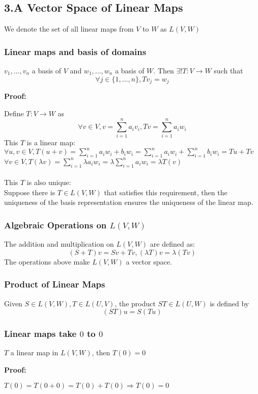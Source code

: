 \documentclass{article}
\begin{document}
\subsection{3.A Vector Space of Linear Maps}
We denote the set of all linear maps from $V$ to $W$ as $L(V, W)$
\subsubsection{Linear maps and basis of domains}
\begin{addmargin}[1em]{0em}
    $v_1, ..., v_n$ a basis of $V$ and $w_1, ..., w_n$ a basis of $W$. Then $\exists! T:V\rightarrow W$ such that
    \begin{equation*}
        \forall j \in \{1,...,n\}, Tv_j = w_j
    \end{equation*}
\end{addmargin}
\textbf{Proof:}
\begin{addmargin}[1em]{0em}
    Define $T:V\rightarrow W$ as
    \begin{equation*}
        \forall v \in V, v = \sum_{i=1}^{n} a_iv_i,
        Tv = \sum_{i=1}^{n} a_iw_i
    \end{equation*}
    This $T$ is a linear map:\\
    $\forall u,v \in V, T(u+v) = \sum_{i=1}^{n} a_iw_i + b_iw_i = \sum_{i=1}^{n} a_iw_i + \sum_{i=1}^{n} b_iw_i = Tu+Tv$\\
    $\forall v \in V, T(\lambda v) = \sum_{i=1}^{n} \lambda a_i w_i = \lambda \sum_{i=1}^{n} a_i w_i = \lambda T(v)$\\\\
    This $T$ is also unique:\\
    Suppose there is $T \in L(V,W)$ that satisfies this requirement, then the uniqueness of the basis representation ensures the uniqueness of the linear map.
\end{addmargin}
\subsubsection{Algebraic Operations on $L(V,W)$}
The addition and multiplication on $L(V,W)$ are defined as:
\begin{equation*}
    (S+T)v = Sv+Tv, (\lambda T)v = \lambda(Tv)
\end{equation*}
The operations above make $L(V,W)$ a vector space.
\subsubsection{Product of Linear Maps}
Given $S\in L(V,W), T\in L(U,V)$, the product $ST\in L(U,W)$ is defined by
\begin{equation*}
    (ST)u = S(Tu)
\end{equation*}
\subsubsection{Linear maps take $0$ to $0$}
\begin{addmargin}[1em]{0em}
    $T$ a linear map in $L(V,W)$, then $T(0)=0$
\end{addmargin}
\textbf{Proof:}
\begin{addmargin}[1em]{0em}
    $T(0) = T(0+0) = T(0) + T(0) \Rightarrow T(0) = 0$
\end{addmargin}
\end{document}
